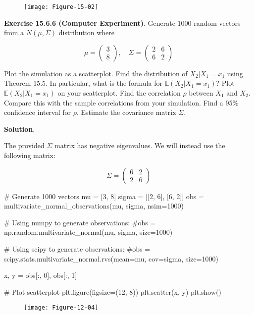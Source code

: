 \begin{figure}[H]
\centering
\texttt{[image: Figure-15-02]}
\end{figure}

\textbf{Exercise 15.6.6 (Computer Experiment)}. Generate 1000 random
vectors from a \(N(\mu, \Sigma)\) distribution where

\[ \mu = \begin{pmatrix} 3 \\ 8\end{pmatrix}
, \quad
\Sigma = \begin{pmatrix}
2 & 6 \\
6 & 2
\end{pmatrix}\]

Plot the simulation as a scatterplot. Find the distribution of
\(X_{2} | X_{1} = x_{1}\) using Theorem 15.5. In particular, what is the
formula for \(\mathbb{E}(X_{2} | X_{1} = x_{1})\)? Plot
\(\mathbb{E}(X_{2} | X_{1} = x_{1})\) on your scatterplot. Find the
correlation \(\rho\) between \(X_{1}\) and \(X_{2}\). Compare this with the
sample correlations from your simulation. Find a 95\% confidence
interval for \(\rho\). Estimate the covariance matrix \(\Sigma\).

\textbf{Solution}.

The provided \(\Sigma\) matrix has negative eigenvalues. We will instead
use the following matrix:

\[ \Sigma = \begin{pmatrix} 6 & 2 \\ 2 & 6\end{pmatrix}\]

\begin{python}
# Generate 1000 vectors
mu = [3, 8]
sigma = [[2, 6], [6, 2]]
obs = multivariate_{n}ormal_observations(mu, sigma, nsim=1000)

# Using numpy to generate observations:
#obs = np.random.multivariate_{n}ormal(mu, sigma, size=1000)

# Using scipy to generate observations:
#obs = scipy.stats.multivariate_{n}ormal.rvs(mean=mu, cov=sigma, size=1000)

x, y = obs[:, 0], obs[:, 1]

# Plot scatterplot
plt.figure(figsize=(12, 8))
plt.scatter(x, y)
plt.show()
\end{python}

\begin{figure}[H]
\centering
\texttt{[image: Figure-12-04]}
\end{figure}

